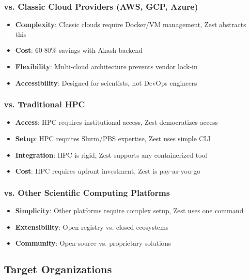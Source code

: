 \documentclass[11pt,a4paper]{article}
\begin{document}
	\subsubsection{vs. Classic Cloud Providers (AWS, GCP, Azure)}
	
	\begin{itemize}
		\item \textbf{Complexity}: Classic clouds require Docker/VM management, Zest abstracts this
		\item \textbf{Cost}: 60-80\% savings with Akash backend
		\item \textbf{Flexibility}: Multi-cloud architecture prevents vendor lock-in
		\item \textbf{Accessibility}: Designed for scientists, not DevOps engineers
	\end{itemize}
	
	\subsubsection{vs. Traditional HPC}
	
	\begin{itemize}
		\item \textbf{Access}: HPC requires institutional access, Zest democratizes access
		\item \textbf{Setup}: HPC requires Slurm/PBS expertise, Zest uses simple CLI
		\item \textbf{Integration}: HPC is rigid, Zest supports any containerized tool
		\item \textbf{Cost}: HPC requires upfront investment, Zest is pay-as-you-go
	\end{itemize}
	
	\subsubsection{vs. Other Scientific Computing Platforms}
	
	\begin{itemize}
		\item \textbf{Simplicity}: Other platforms require complex setup, Zest uses one command
		\item \textbf{Extensibility}: Open registry vs. closed ecosystems
		\item \textbf{Community}: Open-source vs. proprietary solutions
	\end{itemize}
	
	\subsection{Target Organizations}
	
\end{document}
